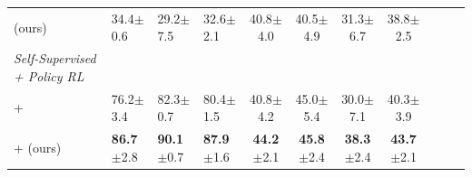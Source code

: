 \begin{table}[t!]
{\begin{tabular}{l l l l ccc cccc}
    \rowcolor{light-gray}
    \wmrlshort{} (ours)
    & 34.4\tiny{$\pm$0.6} & 29.2\tiny{$\pm$7.5} & 32.6\tiny{$\pm$2.1}
    & 40.8\tiny{$\pm$4.0} & 40.5\tiny{$\pm$4.9} & 31.3\tiny{$\pm$6.7} & 38.8\tiny{$\pm$2.5}\\

    \emph{Self-Supervised + Policy RL} \\
    \wmsftshort{} + \policyrl{}
    & 76.2\tiny{$\pm$3.4} & 82.3\tiny{$\pm$0.7} & 80.4\tiny{$\pm$1.5}
    & 40.8\tiny{$\pm$4.2} & 45.0\tiny{$\pm$5.4} & 30.0\tiny{$\pm$7.1} & 40.3\tiny{$\pm$3.9}\\
    
    \rowcolor{light-gray}
    \wmrlshort{} + \policyrl{} (ours)
    & \textbf{86.7}\tiny{$\pm$2.8} & \textbf{90.1}\tiny{$\pm$0.7} & \textbf{87.9}\tiny{$\pm$1.6}
    & \textbf{44.2}\tiny{$\pm$2.1} & \textbf{45.8}\tiny{$\pm$2.4} & \textbf{38.3}\tiny{$\pm$2.4} & \textbf{43.7}\tiny{$\pm$2.1}\\
    \bottomrule
\end{tabular}
  }
  \label{tbl:main_rl_result}
\end{table}

